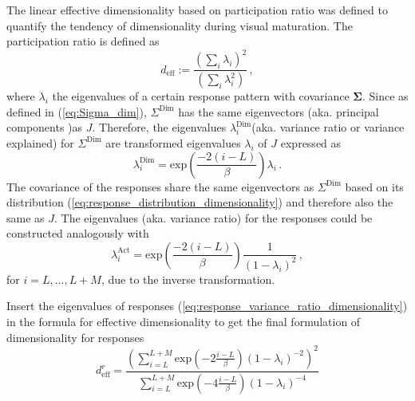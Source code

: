 \documentclass[11pt]{article}
\begin{document}
	The linear effective dimensionality based on participation ratio was defined %
	to quantify the tendency of dimensionality during visual maturation.
	The participation ratio is defined as %
		\begin{equation} \label{eq:effective_dimensionality_analytical}
			d_{\text{eff}} := \frac{\left(\sum_{i} \lambda_i\right)^2}{\left( \sum_{i} \lambda_i^2\right)} \, ,
		\end{equation}
	where $\lambda_i$ the eigenvalues of a certain response pattern with covariance $\mathbf{\Sigma}$. Since as defined in (\ref{eq:Sigma_dim}), $\Sigma^{\text{Dim}}$ has the same eigenvectors (aka. principal components )as $J$. Therefore, the eigenvalues $\lambda_i^{\text{Dim}}$(aka. variance ratio or variance explained) for $\Sigma^{\text{Dim}}$ are transformed eigenvalues $\lambda_i$ of $J$ expressed as
		\begin{equation}
			\lambda_i^{\text{Dim}} = \text{exp}\left(\frac{-2(i-L)}{\beta}\right) \lambda_i \, .
		\end{equation}
	The covariance of the responses share the same eigenvectors as $\Sigma^{\text{Dim}}$ based on its distribution (\ref{eq:response_distribution_dimensionality}) and therefore also the same as $J$. The eigenvalues (aka. variance ratio) for the responses could be constructed analogously with
		\begin{equation} \label{eq:response_variance_ratio_dimensionality}
			\lambda_i^{\text{Act}} = \text{exp}\left(\frac{-2(i-L)}{\beta}\right) \frac{1}{(1-\lambda_i)^2} \, ,
		\end{equation}
	for $i = L, ..., L+M$, due to the inverse transformation. 
	
	Insert the eigenvalues of responses (\ref{eq:response_variance_ratio_dimensionality}) in the formula for effective dimensionality to get the final formulation of dimensionality for responses
		\begin{equation} \label{eq:dim_analytical_sym}
			d^r_{\text{eff}} = \frac{\left(\sum_{i = L}^{L + M} \text{exp}\left(-2 \frac{i-L}{\beta}\right)(1-\lambda_i)^{-2}\right)^2}{\sum_{i=L}^{L+M} \text{exp}\left(-4 \frac{i-L}{\beta}\right)(1-\lambda_i)^{-4}}
		\end{equation}
	
\end{document}
